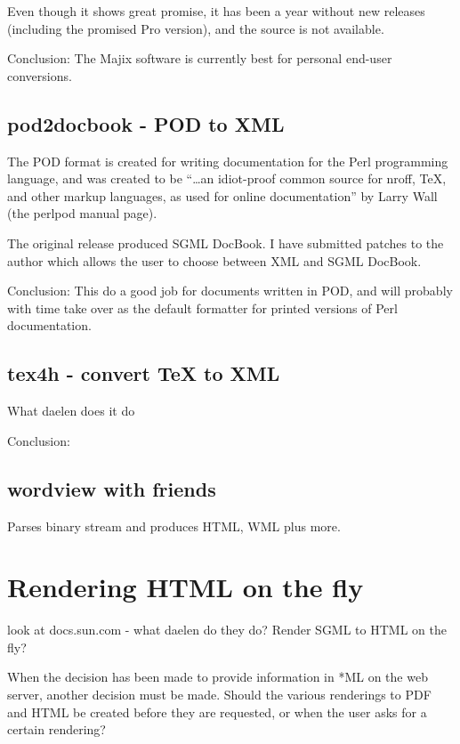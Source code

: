 Even though it shows great promise, it has been a year without new
releases (including the promised Pro version), and the source is not
available. 

Conclusion: The Majix software is currently best for personal end-user
conversions.


\subsection{pod2docbook - POD to XML}

The POD format is created for writing documentation for the Perl
programming language, and was created to be ``\ldots an idiot-proof
common source for nroff, TeX, and other markup languages, as used for
online documentation'' by Larry Wall (\textsf{the perlpod manual
  page}).
       
The original release produced SGML DocBook.  I have submitted patches
to the author which allows the user to choose between XML and SGML
DocBook.

Conclusion:  This do a good job for documents written in POD, and will
probably with time take over as the default formatter for printed
versions of Perl documentation.

\subsection{tex4h - convert {\TeX} to XML}

\textsf{What daelen does it do}      
      
\textsf{Conclusion:}

\subsection{wordview with friends}

\textsf{Parses binary stream and produces HTML, WML plus more.  }


\section{Rendering HTML on the fly}

\textsf{look at docs.sun.com - what daelen do they do?  Render SGML to
  HTML on the fly?}

When the decision has been made to provide information in *ML on the
web server, another decision must be made.  Should the various
renderings to PDF and HTML be created before they are requested, or
when the user asks for a certain rendering?


